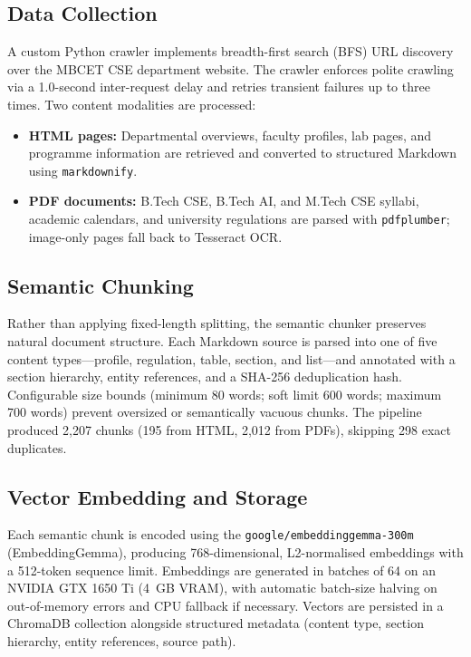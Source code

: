\documentclass{ieeeaccess}
\begin{document}
\subsection{Data Collection}
A custom Python crawler implements breadth-first search (BFS) URL discovery over the MBCET CSE department website. The crawler enforces polite crawling via a 1.0-second inter-request delay and retries transient failures up to three times. Two content modalities are processed:

\begin{itemize}
    \item \textbf{HTML pages:} Departmental overviews, faculty profiles, lab pages, and programme information are retrieved and converted to structured Markdown using \texttt{markdownify}.
    \item \textbf{PDF documents:} B.Tech CSE, B.Tech AI, and M.Tech CSE syllabi, academic calendars, and university regulations are parsed with \texttt{pdfplumber}; image-only pages fall back to Tesseract OCR.
\end{itemize}

\subsection{Semantic Chunking}
Rather than applying fixed-length splitting, the semantic chunker preserves natural document structure. Each Markdown source is parsed into one of five content types---profile, regulation, table, section, and list---and annotated with a section hierarchy, entity references, and a SHA-256 deduplication hash. Configurable size bounds (minimum 80 words; soft limit 600 words; maximum 700 words) prevent oversized or semantically vacuous chunks. The pipeline produced 2,207 chunks (195 from HTML, 2,012 from PDFs), skipping 298 exact duplicates.

\subsection{Vector Embedding and Storage}
Each semantic chunk is encoded using the \newline \texttt{google/embeddinggemma-300m} (EmbeddingGemma), producing 768-dimensional, L2-normalised embeddings with a 512-token sequence limit. Embeddings are generated in batches of 64 on an NVIDIA GTX 1650 Ti (4~GB VRAM), with automatic batch-size halving on out-of-memory errors and CPU fallback if necessary. Vectors are persisted in a ChromaDB collection alongside structured metadata (content type, section hierarchy, entity references, source path).
\end{document}
